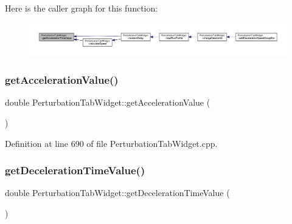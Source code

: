Here is the caller graph for this function\+:
\nopagebreak
\begin{figure}[H]
\begin{center}
\leavevmode
\includegraphics[width=350pt]{class_perturbation_tab_widget_a69d99f18f946cd72a3e1963cbc5196f9_icgraph}
\end{center}
\end{figure}
\mbox{\label{class_perturbation_tab_widget_a2c1a491c8fc908d030f763d675e31d70}} 
\subsubsection{\texorpdfstring{get\+Acceleration\+Value()}{getAccelerationValue()}}
{\footnotesize\ttfamily double Perturbation\+Tab\+Widget\+::get\+Acceleration\+Value (\begin{DoxyParamCaption}{ }\end{DoxyParamCaption})}



Definition at line 690 of file Perturbation\+Tab\+Widget.\+cpp.

\mbox{\label{class_perturbation_tab_widget_aa367d865074bb173bc3b9599eb11e10e}} 
\subsubsection{\texorpdfstring{get\+Deceleration\+Time\+Value()}{getDecelerationTimeValue()}}
{\footnotesize\ttfamily double Perturbation\+Tab\+Widget\+::get\+Deceleration\+Time\+Value (\begin{DoxyParamCaption}{ }\end{DoxyParamCaption})}



